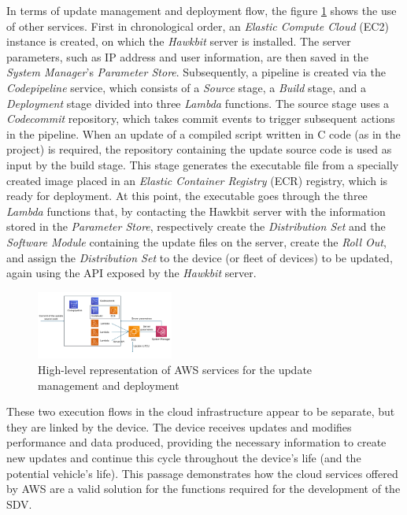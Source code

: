 \documentclass[10pt,a4paper,roman, twocolumn]{article}
\begin{document}
In terms of update management and deployment flow, the figure \ref{fig:AWSUpdateServices} shows the use of other services. First in chronological order, an \textit{Elastic Compute Cloud} (EC2) instance is created, on which the \textit{Hawkbit} server is installed. The server parameters, such as IP address and user information, are then saved in the \textit{System Manager}'s \textit{Parameter Store}. Subsequently, a pipeline is created  via the \textit{Codepipeline} service, which consists of a \textit{Source} stage, a \textit{Build} stage, and a \textit{Deployment} stage divided into three \textit{Lambda} functions. The source stage uses a \textit{Codecommit} repository, which takes commit events to trigger subsequent actions in the pipeline. When an update of a compiled script written in C code (as in the project) is required, the repository containing the update source code is used as input by the build stage. This stage generates the executable file from a specially created image placed in an \textit{Elastic Container Registry} (ECR) registry, which is ready for deployment. At this point, the executable goes through the three \textit{Lambda} functions that, by contacting the Hawkbit server with the information stored in the \textit{Parameter Store}, respectively create the \textit{Distribution Set} and the \textit{Software Module} containing the update files on the server, create the \textit{Roll Out}, and assign the \textit{Distribution Set} to the device (or fleet of devices) to be updated, again using the API exposed by the \textit{Hawkbit} server.
\begin{figure} [tbh]
	\centerline{\includegraphics[width=0.4\textwidth]{images/AWS_update_services.png}}
	\caption{High-level representation of AWS services for the update management and deployment}
	\label{fig:AWSUpdateServices}
\end{figure}

These two execution flows in the cloud infrastructure appear to be separate, but they are linked by the device. The device receives updates and modifies performance and data produced, providing the necessary information to create new updates and continue this cycle throughout the device's life (and the potential vehicle's life). This passage demonstrates how the cloud services offered by AWS are a valid solution for the functions required for the development of the SDV.
\end{document}
